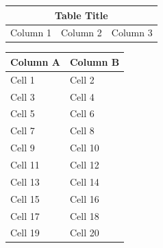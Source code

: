 \begin{tabular}{|l|l|l|}
\hline
\multicolumn{3}{|c|}{Table Title} \\
\hline
Column 1 & Column 2 & Column 3 \\
\hline
\end{tabular}

\vspace{1cm}

\begin{tabular}{|l|l|}
\hline
Column A & Column B \\
\hline
Cell 1 & Cell 2 \\
\hline
Cell 3 & Cell 4 \\
\hline
Cell 5 & Cell 6 \\
\hline
Cell 7 & Cell 8 \\
\hline
Cell 9 & Cell 10 \\
\hline
Cell 11 & Cell 12 \\
\hline
Cell 13 & Cell 14 \\
\hline
Cell 15 & Cell 16 \\
\hline
Cell 17 & Cell 18 \\
\hline
Cell 19 & Cell 20 \\
\hline
\end{tabular}